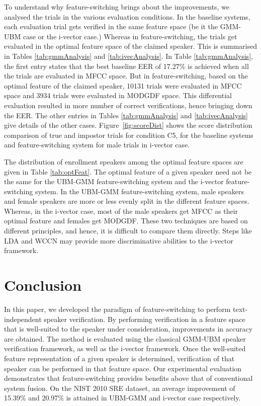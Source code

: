 \documentclass[preprint,12pt,5p]{elsarticle}
\begin{document}
To understand why feature-switching brings about the improvements, we
analysed the trials in the various evaluation conditions. In the baseline
systems, each evaluation trial gets verified in the same feature space (be it
the GMM-UBM case or the i-vector case.) Whereas in feature-switching, the trials
get evaluated in the optimal feature space of the claimed speaker. This is
summarised in Tables \ref{tab:gmmAnalysis} and \ref{tab:ivecAnalysis}.  In Table
\ref{tab:gmmAnalysis}, the first entry states that the best baseline EER of
17.27\% is achieved when all the trials are evaluated in MFCC space. But in
feature-switching, based on the optimal feature of the claimed speaker, 10131
trials were evaluated in MFCC space and 3934 trials were evaluated in MODGDF
space. This differential evaluation resulted in more number of correct
verifications, hence bringing down the EER. The other entries in Tables
\ref{tab:gmmAnalysis} and \ref{tab:ivecAnalysis} give details of the other
cases. Figure~\ref{fig:scoreDist} shows the score distribution comparison of true and 
impostor trials for condition C5, for the baseline systems and feature-switching system 
for male trials in i-vector case.

The distribution of enrollment speakers among the optimal feature spaces
are given in Table \ref{tab:optFeat}. The optimal feature of a given speaker need
not be the same for the UBM-GMM feature-switching system and the i-vector
feature-switching system. 
In the UBM-GMM feature-switching system, male speakers and female speakers are more or less
evenly split in the different feature spaces. Whereas, in the i-vector case, most of the male 
speakers get MFCC as their optimal feature and females get MODGDF. These two techniques are 
based on different principles, and hence, it is difficult to compare them directly. Steps like LDA and 
WCCN may provide more discriminative abilities to the i-vector framework.


\section{Conclusion}
\label{sec:conclude}

In this paper, we developed the paradigm of feature-switching to perform
text-independent speaker verification. By performing verification in a
feature space that is well-suited to the speaker under consideration,
improvements in accuracy are obtained. The method is evaluated using the
classical GMM-UBM speaker verification framework, as well as the i-vector
framework. Once the well-suited feature representation of a given speaker is
determined, verification of that speaker can be performed in that feature space.
Our experimental evaluation demonstrates that feature-switching
provides benefits above that of conventional system fusion. On the NIST 2010 SRE
dataset, an average improvement of 15.39\% and 20.97\% is attained in UBM-GMM and i-vector case respectively.
\end{document}
